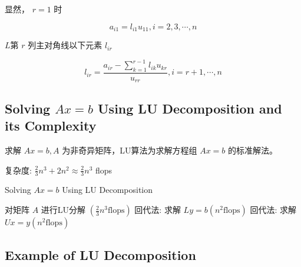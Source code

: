 \begin{corollary}
    显然， $ r=1 $ 时

    \begin{equation} a_{i 1}=l_{i 1} u_{11} , i=2,3, \cdots, n \end{equation}
\end{corollary}

\begin{corollary}
    $L$第 $ r $ 列主对角线以下元素 $ l_{i r} $

    \begin{equation} l_{i r}=\frac{a_{i r}-\sum_{k=1}^{r-1} l_{i k} u_{k r}}{u_{r r}}, i = r + 1, \cdots, n \end{equation}
\end{corollary}






\subsection{Solving $Ax = b$ Using LU Decomposition and its Complexity}

求解 $ A x=b, A $ 为非奇异矩阵，LU算法为求解方程组 $ A x=b $ 的标准解法。

复杂度: $ \frac{2}{3} n^{3}+2 n^{2} \approx \frac{2}{3} n^{3} $ flops

\begin{algorithm}[htbp]
    \caption{Solving $Ax = b$ Using LU Decomposition}
    对矩阵 $ A $ 进行LU分解 $ \left(\frac{2}{3} n^{3} \text{flops} \right) $\;
    回代法: 求解 $ L y=b\left(n^{2}\text{flops} \right) $\;
    回代法: 求解 $ U x=y\left(n^{2}\text{flops} \right) $\;
\end{algorithm}


\subsection{Example of LU Decomposition}

